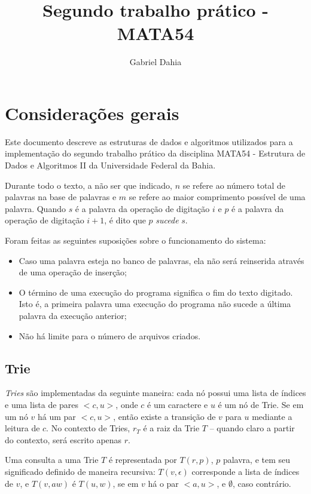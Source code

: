 \documentclass[12pt]{article}
\title{Segundo trabalho prático - MATA54}
\author{Gabriel Dahia}
\begin{document}
  \maketitle

  \section{Considerações gerais}
    Este documento descreve as estruturas de dados e algoritmos utilizados para a implementação do segundo trabalho prático da disciplina MATA54 - Estrutura de Dados e Algoritmos II da Universidade Federal da Bahia.

    Durante todo o texto, a não ser que indicado, $n$ se refere ao número total de palavras na base de palavras e $m$ se refere ao maior comprimento possível de uma palavra.
    Quando $s$ é a palavra da operação de digitação $i$ e $p$ é a palavra da operação de digitação $i + 1$, é dito que $p$ \emph{sucede} $s$.

    Foram feitas as seguintes suposições sobre o funcionamento do sistema:
    \begin{itemize}
      \item Caso uma palavra esteja no banco de palavras, ela não será reinserida através de uma operação de inserção;
      \item O término de uma execução do programa significa o fim do texto digitado.
        Isto é, a primeira palavra uma execução do programa não sucede a última palavra da execução anterior;
      \item Não há limite para o número de arquivos criados.
    \end{itemize}

    \subsection{Trie}
    \emph{Tries} são implementadas da seguinte maneira: cada nó possui uma lista de índices e uma lista de pares $<c, u>$, onde $c$ é um caractere e $u$ é um nó de Trie.
    Se em um nó $v$ há um par $<c, u>$, então existe a transição de $v$ para $u$ mediante a leitura de $c$. 
    No contexto de Tries, $r_T$ é a raiz da Trie $T$ -- quando claro a partir do contexto, será escrito apenas $r$. 

    Uma consulta a uma Trie $T$ é representada por $T(r, p)$, $p$ palavra, e tem seu significado definido de maneira recursiva: $T(v, \epsilon)$ corresponde a lista de índices de $v$, e $T(v, aw)$ é $T(u, w)$, se em $v$ há o par $<a, u>$, e $\emptyset$, caso contrário.
\end{document}
